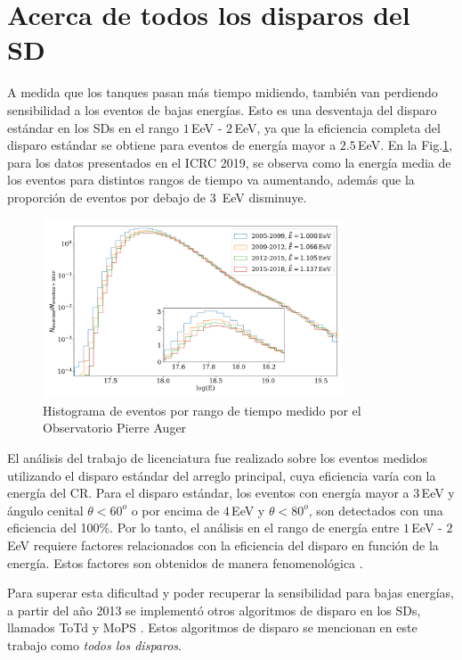 \section{Acerca de todos los disparos del SD}

A medida que los tanques pasan más tiempo midiendo, también van perdiendo sensibilidad a los eventos de bajas energías. Esto es una desventaja del disparo estándar en los SDs en el rango $1\,$EeV - $2\,$EeV, ya que la eficiencia completa  del disparo estándar se obtiene para eventos de energía mayor a $2.5\,$EeV.  En la Fig.\ref{fig:futuro}, para los datos presentados en el ICRC 2019, se observa como la energía media de los eventos para distintos rangos de tiempo va aumentando, además que la proporción de eventos por debajo de $3\,$ EeV disminuye. 

\begin{figure}[H]
	\centering
	\includegraphics[width=0.8\textwidth]{histograma_evolucion_eventos.png}
	\caption{Histograma de eventos por rango de tiempo medido por el Observatorio Pierre Auger}
	\label{fig:futuro}
\end{figure}


El análisis del trabajo de licenciatura fue realizado sobre los eventos medidos utilizando el disparo estándar del arreglo principal, cuya eficiencia varía con la energía del CR. Para el disparo estándar, los eventos con energía mayor a $3\,$EeV y ángulo cenital $\theta<60^o$ o  por encima de $4\,$EeV y $\theta<80^o$, son detectados con una eficiencia del 100\%. Por lo tanto, el análisis en el rango de energía entre $1\,$EeV - $2\,$EeV requiere factores relacionados con la eficiencia del disparo en función de la energía. Estos factores son obtenidos de manera fenomenológica \cite{taborda}. 

Para superar esta dificultad y  poder recuperar la sensibilidad para bajas energías, a partir del año 2013  se implementó otros algoritmos de disparo en los SDs, llamados ToTd y MoPS \cite{pierre2013plans}. Estos algoritmos de disparo se mencionan en este trabajo como \textit{todos los disparos}. 


